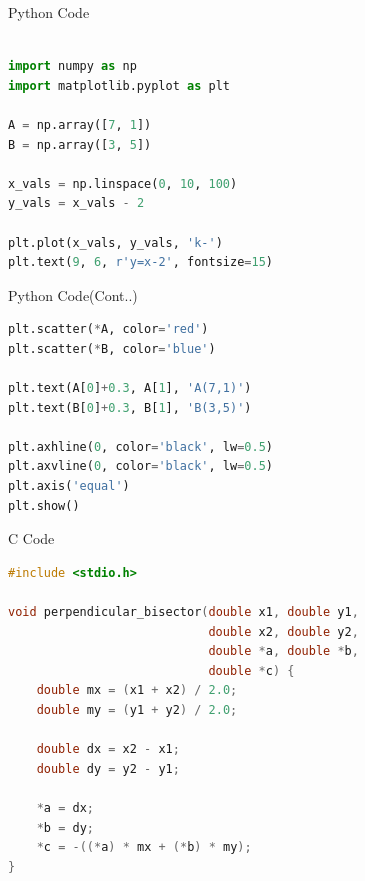 \documentclass{beamer}
\begin{document}
\begin{frame}[fragile]{Python Code}
\begin{lstlisting}[language=Python]

import numpy as np
import matplotlib.pyplot as plt

A = np.array([7, 1])
B = np.array([3, 5])

x_vals = np.linspace(0, 10, 100)
y_vals = x_vals - 2

plt.plot(x_vals, y_vals, 'k-')
plt.text(9, 6, r'y=x-2', fontsize=15)

\end{lstlisting}
\end{frame}

\begin{frame}[fragile]{Python Code(Cont..)}
\begin{lstlisting}[language=Python]
plt.scatter(*A, color='red')
plt.scatter(*B, color='blue')

plt.text(A[0]+0.3, A[1], 'A(7,1)')
plt.text(B[0]+0.3, B[1], 'B(3,5)')

plt.axhline(0, color='black', lw=0.5)
plt.axvline(0, color='black', lw=0.5)
plt.axis('equal')
plt.show()
\end{lstlisting}
\end{frame}

\begin{frame}[fragile]{C Code}
\begin{lstlisting}[language=C]
#include <stdio.h>

void perpendicular_bisector(double x1, double y1,
                            double x2, double y2,
                            double *a, double *b,
                            double *c) {
    double mx = (x1 + x2) / 2.0;
    double my = (y1 + y2) / 2.0;

    double dx = x2 - x1;
    double dy = y2 - y1;

    *a = dx;
    *b = dy;
    *c = -((*a) * mx + (*b) * my);
}
\end{lstlisting}
\end{frame}
\end{document}
